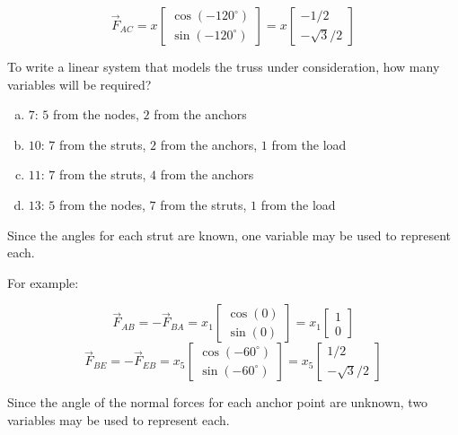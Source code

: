 \begin{applicationActivities}
\begin{observation}
\[
  \vec{F}_{AC}
    = 
  x\begin{bmatrix} \cos(-120^\circ) \\ \sin(-120^\circ) \end{bmatrix}
    =
  x\begin{bmatrix} -1/2 \\ -\sqrt{3}/2\end{bmatrix}
\]
\end{observation}

\begin{activity}{5}
To write a linear system that models the truss under consideration,
how many variables will be required?

\drawtruss{}

\begin{enumerate}[a)]
\item \(7\): \(5\) from the nodes, \(2\) from the anchors
\item \(10\): \(7\) from the struts, \(2\) from the anchors, \(1\) from the load
\item \(11\): \(7\) from the struts, \(4\) from the anchors
\item \(13\): \(5\) from the nodes, \(7\) from the struts, \(1\) from the load
\end{enumerate}
\end{activity}

\begin{observation}
Since the angles for each strut are known,
one variable may be used to represent each.

\drawtruss{}

For example:

\[
\vec F_{AB}=-\vec F_{BA}=x_1\begin{bmatrix}\cos(0)\\\sin(0)\end{bmatrix}
=x_1\begin{bmatrix}1\\0\end{bmatrix}
\]
\[
\vec F_{BE}=-\vec F_{EB}=x_5\begin{bmatrix}\cos(-60^\circ)\\\sin(-60^\circ)\end{bmatrix}
=x_5\begin{bmatrix}1/2\\-\sqrt{3}/2\end{bmatrix}
\]


\end{observation}

\begin{observation}
Since the angle of the normal forces for each anchor point are unknown,
two variables may be used to represent each.


\end{observation}
\end{applicationActivities}
